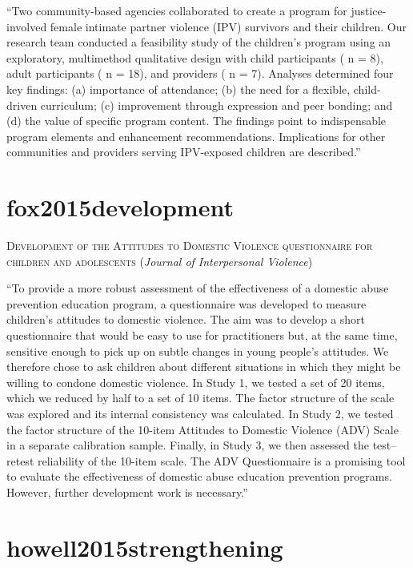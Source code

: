 \documentclass[]{tufte-handout}
\begin{document}
``Two community-based agencies collaborated to create a program for
justice-involved female intimate partner violence (IPV) survivors and
their children. Our research team conducted a feasibility study of the
children's program using an exploratory, multimethod qualitative design
with child participants ( n = 8), adult participants ( n = 18), and
providers ( n = 7). Analyses determined four key findings: (a)
importance of attendance; (b) the need for a flexible, child-driven
curriculum; (c) improvement through expression and peer bonding; and (d)
the value of specific program content. The findings point to
indispensable program elements and enhancement recommendations.
Implications for other communities and providers serving IPV-exposed
children are described.''

\section{\texorpdfstring{\textcolor[HTML]{5b0057}{fox2015development}}{}}\label{section-21}

\textsc{\large{Development of the Attitudes to Domestic Violence questionnaire for children and adolescents}}
(\emph{Journal of Interpersonal Violence})

``To provide a more robust assessment of the effectiveness of a domestic
abuse prevention education program, a questionnaire was developed to
measure children's attitudes to domestic violence. The aim was to
develop a short questionnaire that would be easy to use for
practitioners but, at the same time, sensitive enough to pick up on
subtle changes in young people's attitudes. We therefore chose to ask
children about different situations in which they might be willing to
condone domestic violence. In Study 1, we tested a set of 20 items,
which we reduced by half to a set of 10 items. The factor structure of
the scale was explored and its internal consistency was calculated. In
Study 2, we tested the factor structure of the 10-item Attitudes to
Domestic Violence (ADV) Scale in a separate calibration sample. Finally,
in Study 3, we then assessed the test--retest reliability of the 10-item
scale. The ADV Questionnaire is a promising tool to evaluate the
effectiveness of domestic abuse education prevention programs. However,
further development work is necessary.''

\section{\texorpdfstring{\textcolor[HTML]{5b0057}{howell2015strengthening}}{}}\label{section-22}
\end{document}

